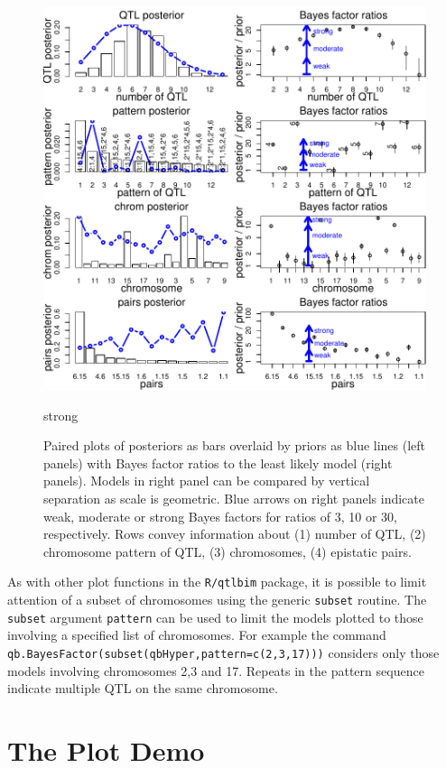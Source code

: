 \documentclass{article}
\begin{document}
\begin{figure}
\includegraphics{qtlbimPDF/FIG-QBBF}
\caption{Paired plots of posteriors as bars overlaid by priors as blue
lines (left panels) with Bayes factor ratios to the least likely model
(right panels). Models in right panel can be compared by vertical
separation as scale is geometric. Blue arrows on right panels indicate
weak, moderate or strong Bayes factors for ratios of 3, 10 or 30,
respectively. Rows convey information about (1) number of QTL, (2)
chromosome pattern of QTL, (3) chromosomes, (4) epistatic pairs.}
strong 
\label{figPlotQBBF}
\end{figure}
As with other plot functions in the \texttt{R/qtlbim} package, it is
possible to limit attention of a subset of chromosomes using the
generic \texttt{subset} routine.  The \texttt{subset} argument
\texttt{pattern} can be used to limit the models plotted to those  
involving a specified list of chromosomes.  For example the command
\texttt{qb.BayesFactor(subset(qbHyper,pattern=c(2,3,17)))} considers
only those models involving chromosomes 2,3 and 17.  Repeats in the
pattern sequence indicate multiple QTL on the same chromosome.

\section{The Plot Demo}
\end{document}
